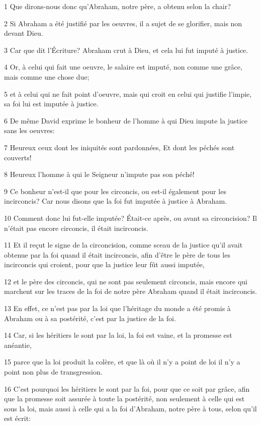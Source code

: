 \par 1 Que dirons-nous donc qu'Abraham, notre père, a obtenu selon la chair?
\par 2 Si Abraham a été justifié par les oeuvres, il a sujet de se glorifier, mais non devant Dieu.
\par 3 Car que dit l'Écriture? Abraham crut à Dieu, et cela lui fut imputé à justice.
\par 4 Or, à celui qui fait une oeuvre, le salaire est imputé, non comme une grâce, mais comme une chose due;
\par 5 et à celui qui ne fait point d'oeuvre, mais qui croit en celui qui justifie l'impie, sa foi lui est imputée à justice.
\par 6 De même David exprime le bonheur de l'homme à qui Dieu impute la justice sans les oeuvres:
\par 7 Heureux ceux dont les iniquités sont pardonnées, Et dont les péchés sont couverts!
\par 8 Heureux l'homme à qui le Seigneur n'impute pas son péché!
\par 9 Ce bonheur n'est-il que pour les circoncis, ou est-il également pour les incirconcis? Car nous disons que la foi fut imputée à justice à Abraham.
\par 10 Comment donc lui fut-elle imputée? Était-ce après, ou avant sa circoncision? Il n'était pas encore circoncis, il était incirconcis.
\par 11 Et il reçut le signe de la circoncision, comme sceau de la justice qu'il avait obtenue par la foi quand il était incirconcis, afin d'être le père de tous les incirconcis qui croient, pour que la justice leur fût aussi imputée,
\par 12 et le père des circoncis, qui ne sont pas seulement circoncis, mais encore qui marchent sur les traces de la foi de notre père Abraham quand il était incirconcis.
\par 13 En effet, ce n'est pas par la loi que l'héritage du monde a été promis à Abraham ou à sa postérité, c'est par la justice de la foi.
\par 14 Car, si les héritiers le sont par la loi, la foi est vaine, et la promesse est anéantie,
\par 15 parce que la loi produit la colère, et que là où il n'y a point de loi il n'y a point non plus de transgression.
\par 16 C'est pourquoi les héritiers le sont par la foi, pour que ce soit par grâce, afin que la promesse soit assurée à toute la postérité, non seulement à celle qui est sous la loi, mais aussi à celle qui a la foi d'Abraham, notre père à tous, selon qu'il est écrit:
